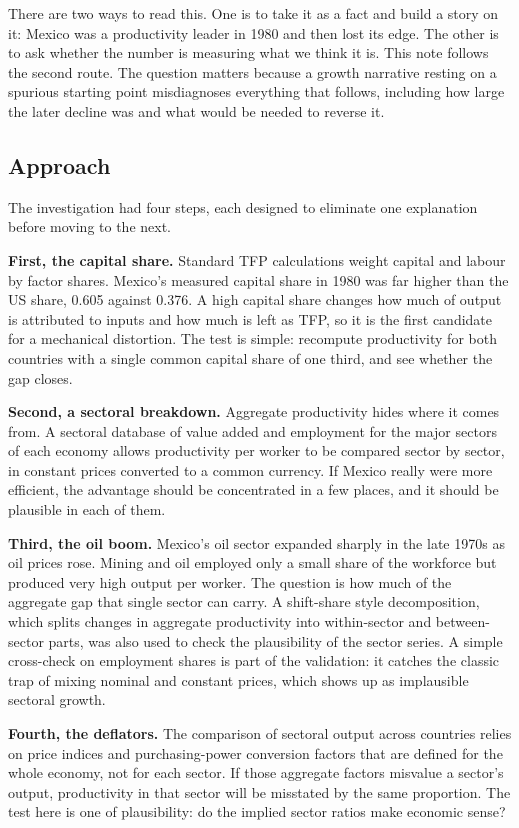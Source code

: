 \documentclass[
  british,
  a4paper,
]{article}
\begin{document}
There are two ways to read this. One is to take it as a fact and build a
story on it: Mexico was a productivity leader in 1980 and then lost its
edge. The other is to ask whether the number is measuring what we think
it is. This note follows the second route. The question matters because
a growth narrative resting on a spurious starting point misdiagnoses
everything that follows, including how large the later decline was and
what would be needed to reverse it.

\subsection{Approach}\label{approach}

The investigation had four steps, each designed to eliminate one
explanation before moving to the next.

\textbf{First, the capital share.} Standard TFP calculations weight
capital and labour by factor shares. Mexico's measured capital share in
1980 was far higher than the US share, 0.605 against 0.376. A high
capital share changes how much of output is attributed to inputs and how
much is left as TFP, so it is the first candidate for a mechanical
distortion. The test is simple: recompute productivity for both
countries with a single common capital share of one third, and see
whether the gap closes.

\textbf{Second, a sectoral breakdown.} Aggregate productivity hides
where it comes from. A sectoral database of value added and employment
for the major sectors of each economy allows productivity per worker to
be compared sector by sector, in constant prices converted to a common
currency. If Mexico really were more efficient, the advantage should be
concentrated in a few places, and it should be plausible in each of
them.

\textbf{Third, the oil boom.} Mexico's oil sector expanded sharply in
the late 1970s as oil prices rose. Mining and oil employed only a small
share of the workforce but produced very high output per worker. The
question is how much of the aggregate gap that single sector can carry.
A shift-share style decomposition, which splits changes in aggregate
productivity into within-sector and between-sector parts, was also used
to check the plausibility of the sector series. A simple cross-check on
employment shares is part of the validation: it catches the classic trap
of mixing nominal and constant prices, which shows up as implausible
sectoral growth.

\textbf{Fourth, the deflators.} The comparison of sectoral output across
countries relies on price indices and purchasing-power conversion
factors that are defined for the whole economy, not for each sector. If
those aggregate factors misvalue a sector's output, productivity in that
sector will be misstated by the same proportion. The test here is one of
plausibility: do the implied sector ratios make economic sense?
\end{document}
